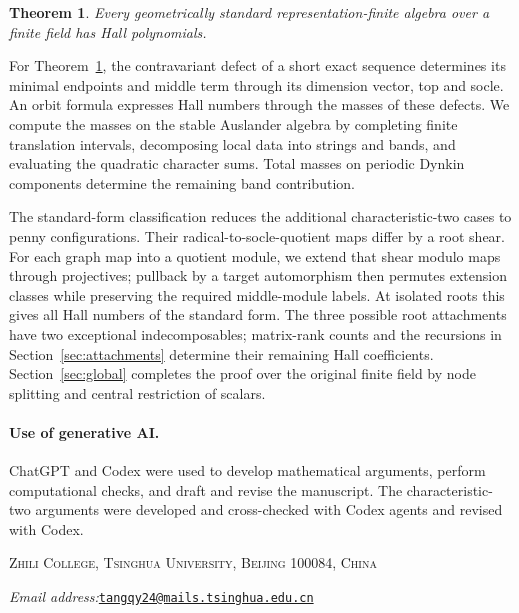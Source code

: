 \documentclass[11pt,a4paper]{article}
\numberwithin{equation}{section}
\newtheorem{theorem}{Theorem}[section]
\theoremstyle{definition}
\begin{document}
\begin{theorem}\label{thm:standard}
Every geometrically standard representation-finite algebra over a finite field has Hall polynomials.
\end{theorem}

For Theorem~\ref{thm:standard}, the contravariant defect of a short exact sequence determines its minimal endpoints and middle term through its dimension vector, top and socle. An orbit formula expresses Hall numbers through the masses of these defects. We compute the masses on the stable Auslander algebra by completing finite translation intervals, decomposing local data into strings and bands, and evaluating the quadratic character sums. Total masses on periodic Dynkin components determine the remaining band contribution.

The standard-form classification \cite{Bongartz13} reduces the additional characteristic-two cases to penny configurations. Their radical-to-socle-quotient maps differ by a root shear. For each graph map into a quotient module, we extend that shear modulo maps through projectives; pullback by a target automorphism then permutes extension classes while preserving the required middle-module labels. At isolated roots this gives all Hall numbers of the standard form. The three possible root attachments have two exceptional indecomposables; matrix-rank counts and the recursions in Section~\ref{sec:attachments} determine their remaining Hall coefficients. Section~\ref{sec:global} completes the proof over the original finite field by node splitting and central restriction of scalars.

\paragraph{Use of generative AI.}
ChatGPT and Codex were used to develop mathematical arguments, perform computational checks, and draft and revise the manuscript. The characteristic-two arguments were developed and cross-checked with Codex agents and revised with Codex.










\medskip
\begingroup\small
\noindent\textsc{Zhili College, Tsinghua University, Beijing 100084, China}\par
\noindent\textit{Email address:}\enspace\mbox{\href{mailto:tangqy24@mails.tsinghua.edu.cn}{\texttt{tangqy24@mails.tsinghua.edu.cn}}}\par
\endgroup
\end{document}

